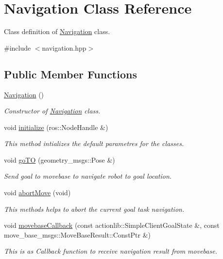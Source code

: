 \hypertarget{class_navigation}{}\section{Navigation Class Reference}
\label{class_navigation}


Class definition of \hyperlink{class_navigation}{Navigation} class.  




{\ttfamily \#include $<$navigation.\+hpp$>$}

\subsection*{Public Member Functions}
\begin{DoxyCompactItemize}
\item 
\hyperlink{class_navigation_a81fdffdefe46340da5fa6c570066b42b}{Navigation} ()
\begin{DoxyCompactList}\small\item\em Constructor of \hyperlink{class_navigation}{Navigation} class. \end{DoxyCompactList}\item 
void \hyperlink{class_navigation_a216797e927d980c6ae3616894dd5cc22}{initialize} (ros\+::\+Node\+Handle \&)
\begin{DoxyCompactList}\small\item\em This method intializes the default parametres for the classes. \end{DoxyCompactList}\item 
void \hyperlink{class_navigation_ab4eb05b112c5704eee596f05a31ac683}{go\+TO} (geometry\+\_\+msgs\+::\+Pose \&)
\begin{DoxyCompactList}\small\item\em Send goal to movebase to navigate robot to goal location. \end{DoxyCompactList}\item 
void \hyperlink{class_navigation_a0e923f3dccd8ff402f697659b1a99a56}{abort\+Move} (void)
\begin{DoxyCompactList}\small\item\em This methods helps to abort the current goal task navigation. \end{DoxyCompactList}\item 
void \hyperlink{class_navigation_a12bd31cca5e1632803d9e18811465761}{movebase\+Callback} (const actionlib\+::\+Simple\+Client\+Goal\+State \&, const move\+\_\+base\+\_\+msgs\+::\+Move\+Base\+Result\+::\+Const\+Ptr \&)
\begin{DoxyCompactList}\small\item\em This is as Callback function to receive navigation result from movebase. \end{DoxyCompactList}\end{DoxyCompactItemize}


